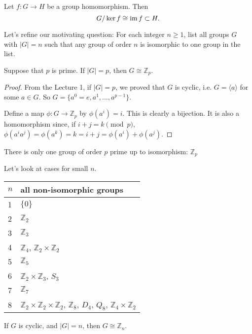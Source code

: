 \begin{theorem}
	Let $f\colon G\to H$ be a group homomorphism. Then
	$$G/\ker f\cong \operatorname{im} f\subset H.$$
\end{theorem}

Let's refine our motivating question: For each integer $n\geq 1$, list all groups $G$ with $|G|=n$ such that any group of order $n$ is isomorphic to one group in the list.

\begin{example}
	Suppose that $p$ is prime. If $|G|=p$, then $G\cong\mathbb Z_p$.

	\begin{proof}
		From the Lecture 1, if $|G|=p$, we proved that $G$ is cyclic, i.e. $G=\langle a\rangle$ for some $a\in G$. So $G=\{a^0=e,a^1,\hdots,a^{p-1}\}$.

		Define a map $\phi\colon G\to\mathbb Z_p$ by $\phi(a^i)=i$. This is clearly a bijection. It is also a homomorphism since, if $i+j=k\pmod{p}$, $\phi(a^ia^j)=\phi(a^k)=k=i+j=\phi(a^i)+\phi(a^j)$.
	\end{proof}
\end{example}

\begin{proposition}
	There is only one group of order $p$ prime up to isomorphism: $\mathbb Z_p$
\end{proposition}

Let's look at cases for small $n$.

\begin{center}
\begin{tabular}{l | l}
	$n$ & all non-isomorphic groups\\ \hline
	1 & $\{0\}$\\
	2 & $\mathbb Z_2$\\
	3 & $\mathbb Z_3$\\
	4 & $\mathbb Z_4$, $\mathbb Z_2\times\mathbb Z_2$\\
	5 & $\mathbb Z_5$\\
	6 & $\mathbb Z_2\times\mathbb Z_3$, $S_3$\\
	7 & $\mathbb Z_7$\\
	8 & $\mathbb Z_2\times\mathbb Z_2\times\mathbb Z_2$, $\mathbb Z_8$, $D_4$, $Q_8$, $\mathbb Z_4\times\mathbb Z_2$
\end{tabular}
\end{center}

\begin{example}
	If $G$ is cyclic, and $|G|=n$, then $G\cong\mathbb Z_n$.
\end{example}

